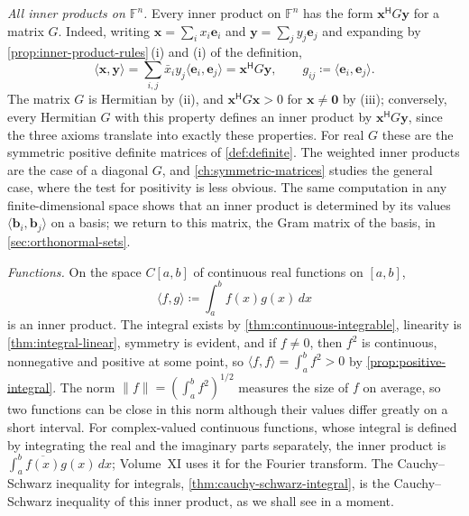 \emph{All inner products on $\mathbb F^n$.} Every inner product on $\mathbb F^n$ has the form $\mathbf x^{\mathsf H}G\mathbf y$ for a matrix $G$. Indeed, writing $\mathbf x=\sum_ix_i\mathbf e_i$ and $\mathbf y=\sum_jy_j\mathbf e_j$ and expanding by \cref{prop:inner-product-rules}\,(i) and (i) of the definition,
\begin{equation}
\langle\mathbf x,\mathbf y\rangle=\sum_{i,j}\bar x_iy_j\langle\mathbf e_i,\mathbf e_j\rangle=\mathbf x^{\mathsf H}G\mathbf y,\qquad g_{ij}\coloneqq\langle\mathbf e_i,\mathbf e_j\rangle .
\label{eq:gram-form}
\end{equation}
The matrix $G$ is Hermitian by (ii), and $\mathbf x^{\mathsf H}G\mathbf x>0$ for $\mathbf x\ne\mathbf 0$ by (iii); conversely, every Hermitian $G$ with this property defines an inner product by $\mathbf x^{\mathsf H}G\mathbf y$, since the three axioms translate into exactly these properties. For real $G$ these are the symmetric positive definite matrices of \cref{def:definite}. The weighted inner products are the case of a diagonal $G$, and \cref{ch:symmetric-matrices} studies the general case, where the test for positivity is less obvious. The same computation in any finite-dimensional space shows that an inner product is determined by its values $\langle\mathbf b_i,\mathbf b_j\rangle$ on a basis; we return to this matrix, the Gram matrix of the basis, in \cref{sec:orthonormal-sets}.

\emph{Functions.} On the space $C[a,b]$ of continuous real functions on $[a,b]$,
\[
\langle f,g\rangle\coloneqq\int_a^bf(x)g(x)\,dx
\]
is an inner product. The integral exists by \cref{thm:continuous-integrable}, linearity is \cref{thm:integral-linear}, symmetry is evident, and if $f\ne0$, then $f^2$ is continuous, nonnegative and positive at some point, so $\langle f,f\rangle=\int_a^bf^2>0$ by \cref{prop:positive-integral}. The norm $\|f\|=(\int_a^bf^2)^{1/2}$ measures the size of $f$ on average, so two functions can be close in this norm although their values differ greatly on a short interval. For complex-valued continuous functions, whose integral is defined by integrating the real and the imaginary parts separately, the inner product is $\int_a^b\overline{f(x)}g(x)\,dx$; Volume~XI uses it for the Fourier transform. The Cauchy--Schwarz inequality for integrals, \cref{thm:cauchy-schwarz-integral}, is the Cauchy--Schwarz inequality of this inner product, as we shall see in a moment.

